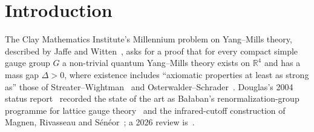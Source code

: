 \documentclass[11pt]{article}
\theoremstyle{definition}
\theoremstyle{remark}
\newcommand{\R}{\mathbb{R}}
\begin{document}
\tableofcontents

\section{Introduction}

The Clay Mathematics Institute's Millennium problem on Yang--Mills theory, described by Jaffe
and Witten~\cite{Jaffe2000}, asks for a proof that for every compact simple gauge group $G$ a
non-trivial quantum Yang--Mills theory exists on $\R^4$ and has a mass gap $\Delta>0$, where
existence includes ``axiomatic properties at least as strong as'' those of
Streater--Wightman~\cite{Streater1964} and Osterwalder--Schrader~\cite{Osterwalder1973,Osterwalder1975}.
Douglas's 2004 status report~\cite{Douglas2004} recorded the state of the art as
Ba{\l}aban's renormalization-group programme for lattice gauge theory~\cite{Balaban1984a,Balaban1987,Balaban1988d,Balaban1989b,Balaban1989c}
and the infrared-cutoff construction of Magnen, Rivasseau and S\'en\'eor~\cite{Magnen1993}; a
2026 review is~\cite{Douglas2026f}.
\end{document}
